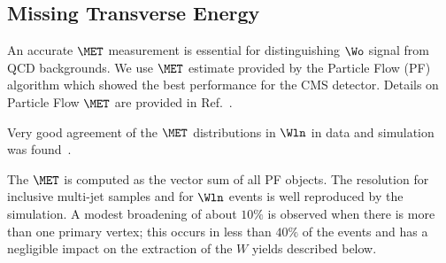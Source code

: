 \subsection{Missing Transverse Energy}
\label{sec:MET}
An accurate $\MET$ measurement is essential for distinguishing
$\Wo$ signal from QCD backgrounds. We use $\MET$ estimate provided
by the Particle Flow (PF) algorithm which showed the best performance for the
CMS detector. Details on Particle Flow $\MET$ are provided in Ref.~\cite{PFMET}. 
\par
Very good agreement of the $\MET$
distributions in $\Wln$ in data and simulation was found~\cite{metPAS}.
\par
The $\MET$ is computed as the vector sum of all PF objects.
The resolution for inclusive multi-jet samples and for
$\Wln$ events is well reproduced by the 
simulation.  A modest broadening of about $10\%$ is observed 
when there is more than one primary vertex; this occurs in less 
than $40\%$ of the events and has a negligible impact on the
extraction of the $W$ yields described below.
